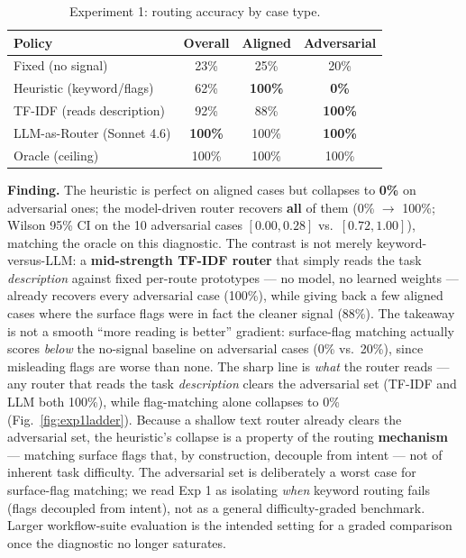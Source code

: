 \documentclass[sigconf,nonacm,anonymous]{acmart}  %
\begin{document}
\begin{table}[t]
\centering
\caption{Experiment 1: routing accuracy by case type.}
\label{tab:exp1}
\small
\begin{tabular}{@{}lccc@{}}
\toprule
\textbf{Policy} & \textbf{Overall} & \textbf{Aligned} & \textbf{Adversarial} \\
\midrule
Fixed (no signal) & 23\% & 25\% & 20\% \\
Heuristic (keyword/flags) & 62\% & \textbf{100\%} & \textbf{0\%} \\
TF-IDF (reads description) & 92\% & 88\% & \textbf{100\%} \\
LLM-as-Router (Sonnet 4.6) & \textbf{100\%} & 100\% & \textbf{100\%} \\
Oracle (ceiling) & 100\% & 100\% & 100\% \\
\bottomrule
\end{tabular}
\end{table}

\textbf{Finding.} The heuristic is perfect on aligned cases but collapses to
\textbf{0\%} on adversarial ones; the model-driven router recovers \textbf{all} of
them (0\% $\to$ 100\%; Wilson 95\% CI on the 10 adversarial cases $[0.00, 0.28]$
vs.\ $[0.72, 1.00]$), matching the oracle on this diagnostic. The contrast is not
merely keyword-versus-LLM: a \textbf{mid-strength TF-IDF router} that simply reads
the task \emph{description} against fixed per-route prototypes --- no model, no
learned weights --- already recovers every adversarial case (100\%), while giving
back a few aligned cases where the surface flags were in fact the cleaner signal
(88\%). The takeaway is not a smooth ``more reading is better'' gradient:
surface-flag matching actually scores \emph{below} the no-signal baseline on
adversarial cases (0\% vs.\ 20\%), since misleading flags are worse than none. The
sharp line is \emph{what} the router reads --- any router that reads the task
\emph{description} clears the adversarial set (TF-IDF and LLM both 100\%), while
flag-matching alone collapses to 0\% (Fig.~\ref{fig:exp1ladder}). Because a shallow text router already clears
the adversarial set, the heuristic's collapse is a property of the routing
\textbf{mechanism} --- matching surface flags that, by construction, decouple from
intent --- not of inherent task difficulty. The adversarial set is deliberately a
worst case for surface-flag matching; we read Exp 1 as isolating \emph{when}
keyword routing fails (flags decoupled from intent), not as a general
difficulty-graded benchmark. Larger workflow-suite evaluation is the intended
setting for a graded comparison once the diagnostic no longer saturates.
\end{document}
